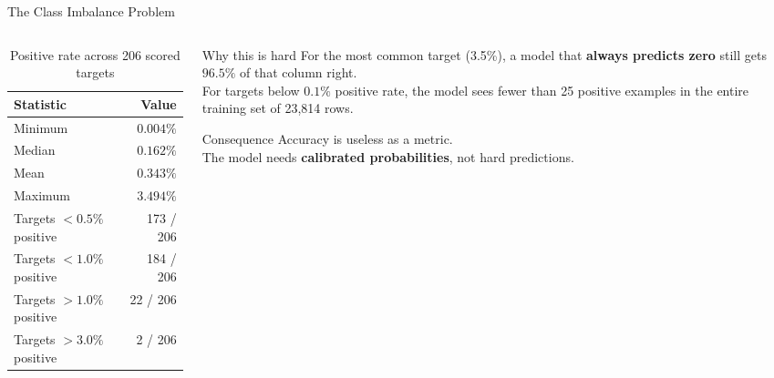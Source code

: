 \documentclass[aspectratio=169, 10pt]{beamer}
\begin{document}
\begin{frame}{The Class Imbalance Problem}
  \begin{columns}[T]
    \begin{column}{0.48\textwidth}
      \begin{table}
        \caption{Positive rate across 206 scored targets}
        \small
        \begin{tabular}{lr}
          \toprule
          \textbf{Statistic} & \textbf{Value} \\
          \midrule
          Minimum & $0.004\%$ \\
          Median  & $0.162\%$ \\
          Mean    & $0.343\%$ \\
          Maximum & $3.494\%$ \\
          \midrule
          Targets $<0.5\%$ positive & 173 / 206 \\
          Targets $<1.0\%$ positive & 184 / 206 \\
          Targets $>1.0\%$ positive & 22 / 206  \\
          Targets $>3.0\%$ positive & 2 / 206   \\
          \bottomrule
        \end{tabular}
      \end{table}
    \end{column}
    \begin{column}{0.48\textwidth}
      \begin{alertblock}{Why this is hard}
        For the most common target (3.5\%), a model that
        \textbf{always predicts zero} still gets $96.5\%$ of
        that column right.\\[0.5em]
        For targets below $0.1\%$ positive rate,
        the model sees fewer than 25 positive examples
        in the entire training set of 23,814 rows.
      \end{alertblock}
      \vspace{0.4em}
      \begin{exampleblock}{Consequence}
        Accuracy is useless as a metric.\\
        The model needs \textbf{calibrated probabilities},
        not hard predictions.
      \end{exampleblock}
    \end{column}
  \end{columns}
\end{frame}

\end{document}
